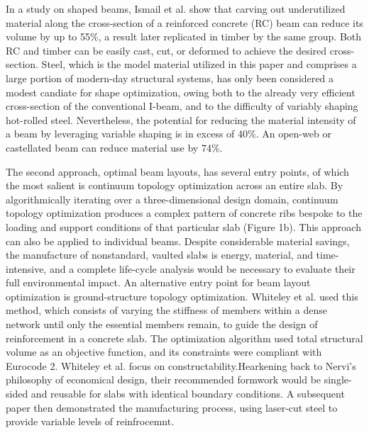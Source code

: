 \documentclass[10pt, letterpaper]{article} %
\begin{document}
    In a study on shaped beams, Ismail et al. show that carving out underutilized material along the cross-section of a reinforced concrete (RC) beam can reduce its volume by up to 55\%, a result later replicated in timber by the same group.\cite{ismailShapedBeamsUnlocking2021}\cite{mayencourtHybridAnalyticalComputational2020} Both RC and timber can be easily cast, cut, or deformed to achieve the desired cross-section. Steel, which is the model material utilized in this paper and comprises a large portion of modern-day structural systems, has only been considered a modest candiate for shape optimization, owing both to the already very efficient cross-section of the conventional I-beam, and to the difficulty of variably shaping hot-rolled steel.\cite{leeGeometryStrengthEfficiency2024} Nevertheless, the potential for reducing the material intensity of a beam by leveraging variable shaping is in excess of 40\%. An open-web or castellated beam can reduce material use by 74\%.\cite{carruthTechnicalPotentialReducing2011} 

    The second approach, optimal beam layouts, has several entry points, of which the most salient is continuum topology optimization across an entire slab.\cite{meibodiSmartSlabComputational2018} By algorithmically iterating over a three-dimensional design domain, continuum topology optimization produces a complex pattern of concrete ribs bespoke to the loading and support conditions of that particular slab (Figure 1b).\cite{rippmannDesignFabricationTesting2018} This approach can also be applied to individual beams. \cite{jewettTopologyoptimizedDesignConstruction2019} Despite considerable material savings, the manufacture of nonstandard, vaulted slabs is energy, material, and time-intensive, and a complete life-cycle analysis would be necessary to evaluate their full environmental impact.\cite{liEnergyRequirementsEvaluation2013} An alternative entry point for beam layout optimization is ground-structure topology optimization. Whiteley et al. used this method, which consists of varying the stiffness of members within a dense network until only the essential members remain, to guide the design of reinforcement in a concrete slab.\cite{whiteleyEngineeringDesignOptimized2023} The optimization algorithm used total structural volume as an objective function, and its constraints were compliant with Eurocode 2. Whiteley et al. focus on constructability.Hearkening back to Nervi’s philosophy of economical design, their recommended formwork would be single-sided and reusable for slabs with identical boundary conditions. A subsequent paper then demonstrated the manufacturing process, using laser-cut steel to provide variable levels of reinfrocemnt.\cite{bradburyApplicationsOptimalReinforcement2024} 
\end{document}

